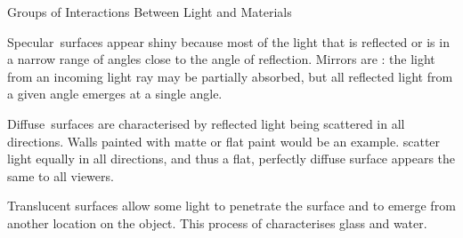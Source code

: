 \documentclass[../COS3712_Notes.tex]{subfiles}
\begin{document}
      \begin{sidenote}{Groups of Interactions Between Light and Materials}
        $ $\vspace{-1em}
        \begin{descriptimize}[nosep]
          \item[Specular~surfaces] appear shiny because most of the light
            that is reflected or  is in a narrow range of angles
            close to the angle of reflection.
            Mirrors are : the light from an incoming
            light ray may be partially absorbed, but all reflected light from a given angle
            emerges at a single angle.
          \item[Diffuse~surfaces] are characterised by reflected light being scattered
            in all directions.
            Walls painted with matte or flat paint would be an example.
             scatter light equally in all directions,
            and thus a flat, perfectly diffuse surface appears the same to all viewers.
          \item[Translucent surfaces] allow some light to penetrate the surface
            and to emerge from another location on the object.
            This process of  characterises glass and water.
        \end{descriptimize}
      \end{sidenote}
\end{document}
